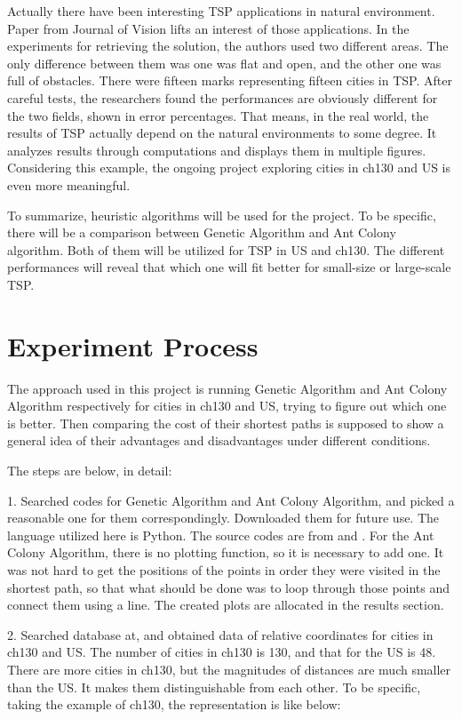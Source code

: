 \documentclass{article}
\begin{document}
Actually there have been interesting TSP applications in natural environment. Paper\citep{FlipPhillips2010TTSP} from Journal of Vision lifts an interest of those applications. In the experiments for retrieving the solution, the authors used two different areas. The only difference between them was one was flat and open, and the other one was full of obstacles. There were fifteen marks representing fifteen cities in TSP. After careful tests, the researchers found the performances are obviously different for the two fields, shown in error percentages. That means, in the real world, the results of TSP actually depend on the natural environments to some degree. It analyzes results through computations and displays them in multiple figures. Considering this example, the ongoing project exploring cities in ch130 and US is even more meaningful. 

To summarize, heuristic algorithms will be used for the project. To be specific, there will be a comparison between Genetic Algorithm and Ant Colony algorithm. Both of them will be utilized for TSP in US and ch130. The different performances will reveal that which one will fit better for small-size or large-scale TSP.


 

\section{Experiment Process}
The approach used in this project is running Genetic Algorithm and Ant Colony Algorithm respectively for cities in ch130 and US, trying to figure out which one is better. Then comparing the cost of their shortest paths is supposed to show a general idea of their advantages and disadvantages under different conditions. 

The steps are below, in detail:

1. Searched codes for Genetic Algorithm and Ant Colony Algorithm, and picked a reasonable one for them correspondingly. Downloaded them for future use. The language utilized here is Python. The source codes are from\citep{gacode} and \citep{acocode}. For the Ant Colony Algorithm, there is no plotting function, so it is necessary to add one. It was not hard to get the positions of the points in order they were visited in the shortest path, so that what should be done was to loop through those points and connect them using a line. The created plots are allocated in the results section.

2. Searched database at\citep{database}, and obtained data of relative coordinates for cities in ch130 and US. The number of cities in ch130 is 130, and that for the US is 48. There are more cities in ch130, but the magnitudes of distances are much smaller than the US. It makes them distinguishable from each other.
To be specific, taking the example of ch130, the representation is like below:
\end{document}
